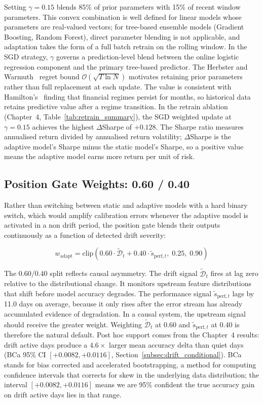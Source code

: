 Setting $\gamma = 0.15$ blends 85\% of prior parameters with 15\% of recent window parameters. This convex combination is well defined for linear models whose parameters are real-valued vectors; for tree-based ensemble models (Gradient Boosting, Random Forest), direct parameter blending is not applicable, and adaptation takes the form of a full batch retrain on the rolling window. In the SGD strategy, $\gamma$ governs a prediction-level blend between the online logistic regression component and the primary tree-based predictor. The Herbster and Warmuth~\cite{herbster1998} regret bound $\mathcal{O}(\sqrt{T\ln N})$ motivates retaining prior parameters rather than full replacement at each update. The value is consistent with Hamilton's~\cite{hamilton1989} finding that financial regimes persist for months, so historical data retains predictive value after a regime transition. In the retrain ablation (Chapter~4, Table~\ref{tab:retrain_summary}), the SGD weighted update at $\gamma{=}0.15$ achieves the highest $\Delta$Sharpe of $+0.128$. The Sharpe ratio measures annualised return divided by annualised return volatility; $\Delta$Sharpe is the adaptive model's Sharpe minus the static model's Sharpe, so a positive value means the adaptive model earns more return per unit of risk.

\subsection{Position Gate Weights: 0.60 / 0.40}
\label{subsec:param_gate}

Rather than switching between static and adaptive models with a hard binary switch, which would amplify calibration errors whenever the adaptive model is activated in a non drift period, the position gate blends their outputs continuously as a function of detected drift severity:

\begin{equation}
  w_{\text{adapt}} = \text{clip}\!\left(
    0.60 \cdot \tilde{\mathcal{D}}_t + 0.40 \cdot \tilde{s}_{\text{perf},t},\;
    0.25,\; 0.90
  \right)
  \label{eq:gate_ch2}
\end{equation}

The 0.60/0.40 split reflects causal asymmetry. The drift signal $\tilde{\mathcal{D}}_t$ fires at lag zero relative to the distributional change. It monitors upstream feature distributions that shift before model accuracy degrades. The performance signal $\tilde{s}_{\text{perf},t}$ lags by 11.0 days on average, because it only rises after the error stream has already accumulated evidence of degradation. In a causal system, the upstream signal should receive the greater weight. Weighting $\tilde{\mathcal{D}}_t$ at 0.60 and $\tilde{s}_{\text{perf},t}$ at 0.40 is therefore the natural default. Post hoc support comes from the Chapter~4 results: drift active days produce a $4.6\times$ larger mean accuracy delta than quiet days (BCa 95\% CI $[{+}0.0082,{+}0.0116]$, Section~\ref{subsec:drift_conditional}). BCa stands for bias corrected and accelerated bootstrapping, a method for computing confidence intervals that corrects for skew in the underlying data distribution; the interval $[{+}0.0082,{+}0.0116]$ means we are 95\% confident the true accuracy gain on drift active days lies in that range.

